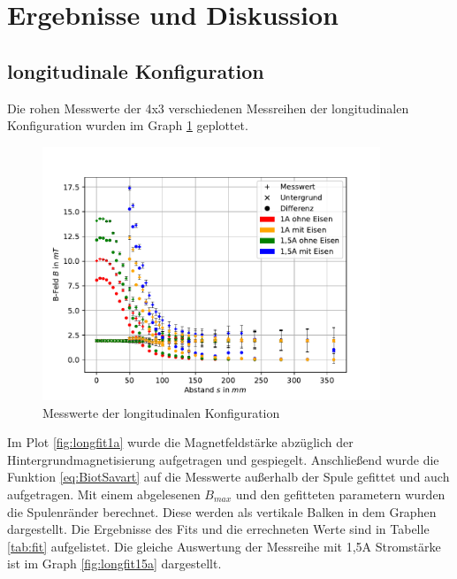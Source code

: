\documentclass[11pt, a4paper]{article}
\begin{document}
    \section{Ergebnisse und Diskussion}
    \subsection{longitudinale Konfiguration}
    Die rohen Messwerte der 4x3 verschiedenen Messreihen der longitudinalen Konfiguration wurden im Graph \ref{fig:longmess} geplottet.
    \begin{figure}[h]
        \centering
        \includegraphics[width=0.9\textwidth]{raw1.pdf}
        \caption{Messwerte der longitudinalen Konfiguration}
        \label{fig:longmess}
    \end{figure}

    Im Plot \ref{fig:longfit1a} wurde die Magnetfeldstärke abzüglich der Hintergrundmagnetisierung aufgetragen und gespiegelt. Anschließend wurde die Funktion \ref{eq:BiotSavart} auf die Messwerte außerhalb der Spule gefittet und auch aufgetragen. Mit einem abgelesenen $B_{max}$ und den gefitteten parametern wurden die Spulenränder berechnet. Diese werden als vertikale Balken in dem Graphen dargestellt. Die Ergebnisse des Fits und die errechneten Werte sind in Tabelle \ref{tab:fit} aufgelistet. Die gleiche Auswertung der Messreihe mit 1,5A Stromstärke ist im Graph \ref{fig:longfit15a} dargestellt.
    
\end{document}
